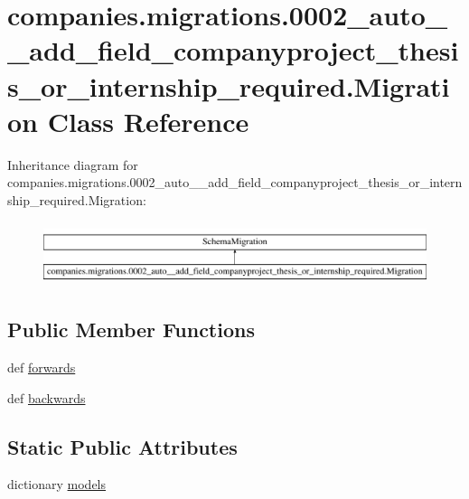 \hypertarget{classcompanies_1_1migrations_1_10002__auto____add__field__companyproject__thesis__or__internship__required_1_1_migration}{\section{companies.\-migrations.0002\-\_\-auto\-\_\-\-\_\-add\-\_\-field\-\_\-companyproject\-\_\-thesis\-\_\-or\-\_\-internship\-\_\-required.Migration Class Reference}
\label{classcompanies_1_1migrations_1_10002__auto____add__field__companyproject__thesis__or__internship__required_1_1_migration}
}
Inheritance diagram for companies.\-migrations.0002\-\_\-auto\-\_\-\-\_\-add\-\_\-field\-\_\-companyproject\-\_\-thesis\-\_\-or\-\_\-internship\-\_\-required.Migration\-:\begin{figure}[H]
\begin{center}
\leavevmode
\includegraphics[height=1.872910cm]{classcompanies_1_1migrations_1_10002__auto____add__field__companyproject__thesis__or__internship__required_1_1_migration}
\end{center}
\end{figure}
\subsection*{Public Member Functions}
\begin{DoxyCompactItemize}
\item 
def \hyperlink{classcompanies_1_1migrations_1_10002__auto____add__field__companyproject__thesis__or__internship__required_1_1_migration_a8705bee12c5f0bc405fd22dc1f2f185e}{forwards}
\item 
def \hyperlink{classcompanies_1_1migrations_1_10002__auto____add__field__companyproject__thesis__or__internship__required_1_1_migration_a1b74d74c92a6936ac4d742944df49f78}{backwards}
\end{DoxyCompactItemize}
\subsection*{Static Public Attributes}
\begin{DoxyCompactItemize}
\item 
dictionary \hyperlink{classcompanies_1_1migrations_1_10002__auto____add__field__companyproject__thesis__or__internship__required_1_1_migration_a9588ee743562fa38eb791adc0bcb8a17}{models}
\end{DoxyCompactItemize}


